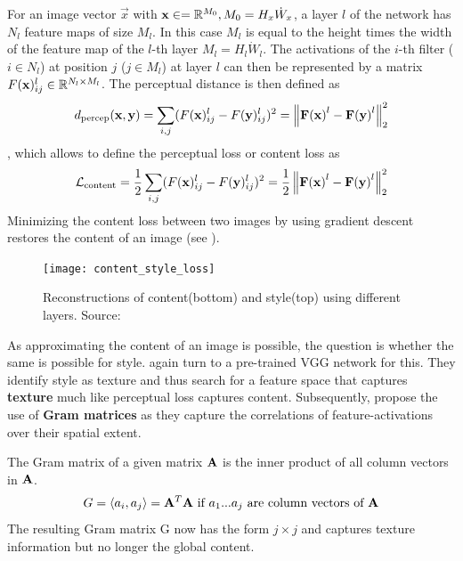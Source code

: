 For an image vector $\vec{x}$ with $\mathbf{x} \in = \mathbb{R}^{M_0}, M_0 = H_x \dot W_x $, a layer $l$ of the network has $N_l$ feature maps of size $M_l$.
In this case $M_l$ is equal to the height times the width of the feature map of the $l$-th layer  $M_l = H_l \dot W_l $.
The activations of the $i$-th filter ($i \in N_l$) at position $j$ ($j \in M_l$) at layer $l$ can then be represented by a matrix $F(\mathbf{x})_{ij}^l \in \mathbb{R}^{N_l \times M_l}$.
The perceptual distance is then defined as
\begin{align}
    d_{\text{percep}}(\mathbf{x}, \mathbf{y}) = \sum_{i, j} (F(\mathbf{x})_{ij}^l - F(\mathbf{y})_{ij}^l)^2 = \left\lVert\mathbf{F(\mathbf{x})}^l - \mathbf{F(\mathbf{y})}^l\right\rVert_2^2
\end{align}
, which allows to define the perceptual loss or content loss as 
\begin{align}
    \mathcal{L}_{\text{content}} = \frac{1}{2} \sum_{i, j} (F(\mathbf{x})_{ij}^l - F(\mathbf{y})_{ij}^l)^2 = \frac{1}{2} \left\lVert\mathbf{F(\mathbf{x})}^l - \mathbf{F(\mathbf{y})}^l\right\rVert_2^2
\end{align}
Minimizing the content loss between two images by using gradient descent restores the content of an image (see ).
\begin{figure}
    \texttt{[image: content\_style\_loss]}
    \caption[]{Reconstructions of content(bottom) and style(top) using different layers. Source:\cite{gatys}}
\end{figure}

As approximating the content of an image is possible, the question is whether the same is possible for style.
\citeauthor*{gatys} again turn to a pre-trained VGG network for this.
They identify style as texture and thus search for a feature space that captures \textbf{texture} much like perceptual loss captures content.
Subsequently, \citeauthor*{gatys} propose the use of \textbf{Gram matrices} as they capture the correlations of feature-activations over their spatial extent.

The Gram matrix of a given matrix $\mathbf{A}$ is the inner product of all column vectors in $\mathbf{A}$.
\begin{align}
    G = \langle a_{i}, a_{j} \rangle = \mathbf{A}^T \mathbf{A} \text{ if $a_1$...$a_j$ are column vectors of $\mathbf{A}$}
\end{align}
The resulting Gram matrix G now has the form $j \times j$ and captures texture information but no longer the global content.

